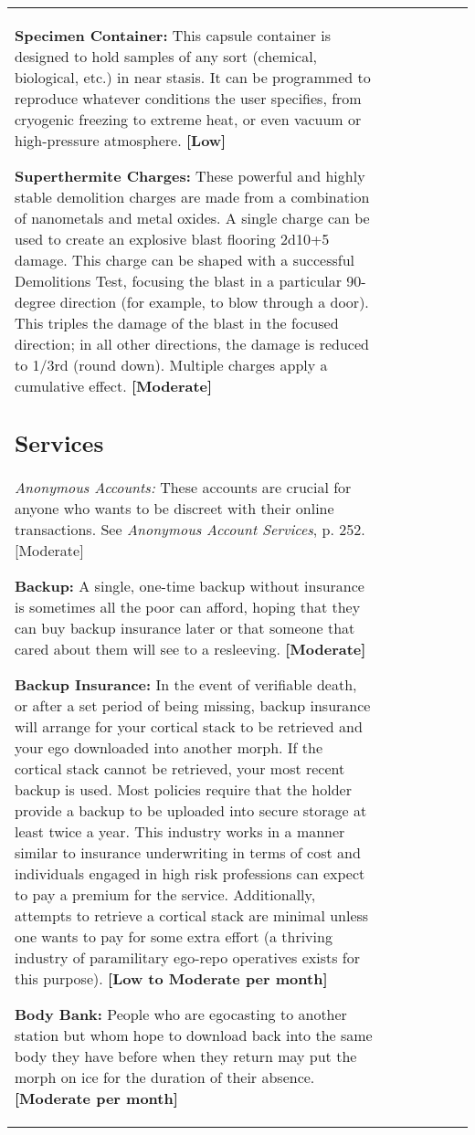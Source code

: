 \begin{tabular}{|l|l|l|l|l|l|l|}
\textbf{Specimen Container:} This capsule container is designed to hold samples of any sort (chemical, biological, etc.) in near stasis. It can be programmed to reproduce whatever conditions the user specifies, from cryogenic freezing to extreme heat, or even vacuum or high-pressure atmosphere. \textbf{[Low]} 

\textbf{Superthermite Charges:} These powerful and highly stable demolition charges are made from a combination of nanometals and metal oxides. A single charge can be used to create an explosive blast flooring 2d10+5 damage. This charge can be shaped with a successful Demolitions Test, focusing the blast in a particular 90-degree direction (for example, to blow through a door). This triples the damage of the blast in the focused direction; in all other directions, the damage is reduced to 1/3rd (round down). Multiple charges apply a cumulative effect. \textbf{[Moderate]} 

\subsection{Services} \label{sec:services} 

\emph{Anonymous Accounts:} These accounts are crucial for anyone who wants to be discreet with their online transactions. See \emph{Anonymous Account Services}, p. 252. [Moderate] 

\textbf{Backup:} A single, one-time backup without insurance is sometimes all the poor can afford, hoping that they can buy backup insurance later or that someone that cared about them will see to a resleeving. \textbf{[Moderate]} 

\textbf{Backup Insurance:} In the event of verifiable death, or after a set period of being missing, backup insurance will arrange for your cortical stack to be retrieved and your ego downloaded into another morph. If the cortical stack cannot be retrieved, your most recent backup is used. Most policies require that the holder provide a backup to be uploaded into secure storage at least twice a year. This industry works in a manner similar to insurance underwriting in terms of cost and individuals engaged in high risk professions can expect to pay a premium for the service. Additionally, attempts to retrieve a cortical stack are minimal unless one wants to pay for some extra effort (a thriving industry of paramilitary ego-repo operatives exists for this purpose). \textbf{[Low to Moderate per month]} 

\textbf{Body Bank:} People who are egocasting to another station but whom hope to download back into the same body they have before when they return may put the morph on ice for the duration of their absence. \textbf{[Moderate per month]} 


\end{tabular}
